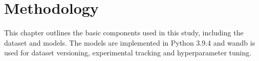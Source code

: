 \chapter{Methodology}
\label{ch:Methodology}
This chapter outlines the basic components used in this study, including the dataset and models. The models are implemented in Python 3.9.4 and \gls{wandb} is used for dataset versioning, experimental tracking and hyperparameter tuning.





